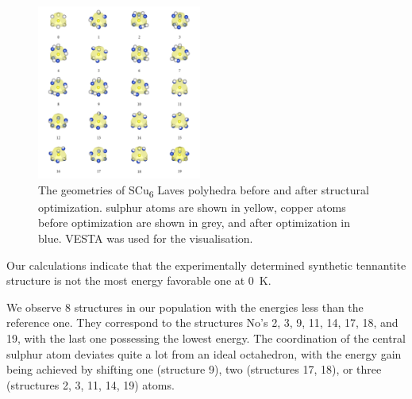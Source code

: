 \documentclass[preprint,review,12pt]{elsarticle}
\begin{document}
\begin{figure}
\centering
 \includegraphics[width=0.48\textwidth]{Init_and_opt_renamed}
 \caption{\label{fig:init_and_opt_laves} The geometries of SCu\textsubscript{6} Laves polyhedra before and after structural optimization. sulphur atoms are shown in yellow, copper atoms before optimization are shown in grey, and after optimization in blue. VESTA\cite{Momma2011} was used for the visualisation. }
\end{figure}

Our calculations indicate that the experimentally determined synthetic tennantite structure is not the most energy favorable one at 0~K.

We observe 8 structures in our population with the energies less than the reference one.
They correspond to the structures No's 2, 3, 9, 11, 14, 17, 18, and 19, with the last one  possessing the lowest energy.
The coordination of the central sulphur atom deviates quite a lot from an ideal octahedron, with the energy gain being achieved by shifting one (structure 9), two (structures 17, 18), or three (structures 2, 3, 11, 14, 19) atoms.

%
\end{document}
